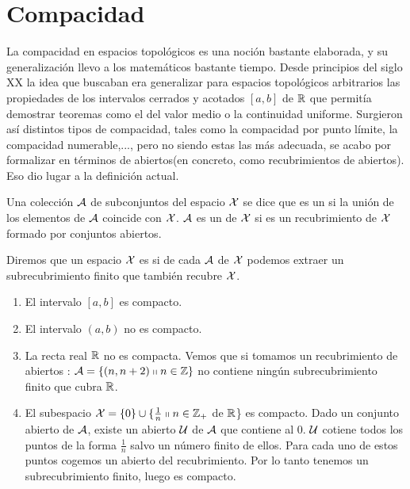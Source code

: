 \chapter{Compacidad}
\label{comp}

La compacidad en espacios topológicos es una noción bastante elaborada, y su generalización llevo a los matemáticos bastante tiempo. Desde principios del siglo XX la idea que buscaban era generalizar para espacios topológicos arbitrarios las propiedades de los intervalos cerrados y acotados $[a,b]$ de $\mathbb{R}$ que permitía demostrar teoremas como el del valor medio o la continuidad uniforme. Surgieron así distintos tipos de compacidad, tales como la compacidad por punto límite, la compacidad numerable,...,  pero no siendo estas las más adecuada, se acabo por formalizar en términos de abiertos(en concreto, como recubrimientos de abiertos). Eso dio lugar a la definición actual.
\begin{defi}
	Una colección $\mathcal{A}$ de subconjuntos del espacio $\mathcal{X}$ se dice que es un  si la unión de los elementos de $\mathcal{A}$ coincide con $\mathcal{X}$. $\mathcal{A}$ es un  de $\mathcal{X}$ si es un recubrimiento de $\mathcal{X}$ formado por conjuntos abiertos.
\end{defi}

\begin{defi}[Compacto]
	Diremos que un espacio $\mathcal{X}$ es  si de cada  $\mathcal{A}$ de $\mathcal{X}$ podemos extraer un subrecubrimiento finito que también recubre $\mathcal{X}$.
\end{defi}

\begin{exa}
	\begin{enumerate}
		\item El intervalo $[a,b]$ es compacto.
		\item El intervalo $(a,b)$ no es compacto.
		\item La recta real $\mathbb{R}$ no es compacta. Vemos que si tomamos un recubrimiento de abiertos : $\mathcal{A}=\{(n,n+2) \shortparallel n \in \mathbb{Z}\}$ no contiene ningún subrecubrimiento finito que cubra $\mathbb{R}$.
		\item El subespacio $\mathcal{X} = \{0\} \cup \{\frac{1}{n} \shortparallel n \in \mathbb{Z}_{+}$ de $\mathbb{R}$\} es compacto.
		Dado un conjunto abierto de $\mathcal{A}$, existe un abierto $\mathcal{U}$ de $\mathcal{A}$ que contiene al $0$. $\mathcal{U}$ cotiene todos los puntos de la forma $\frac{1}{n}$ salvo un número finito de ellos. Para cada uno de estos puntos cogemos un abierto del recubrimiento. Por lo tanto tenemos un subrecubrimiento finito, luego es compacto. 
	\end{enumerate}
\end{exa}

